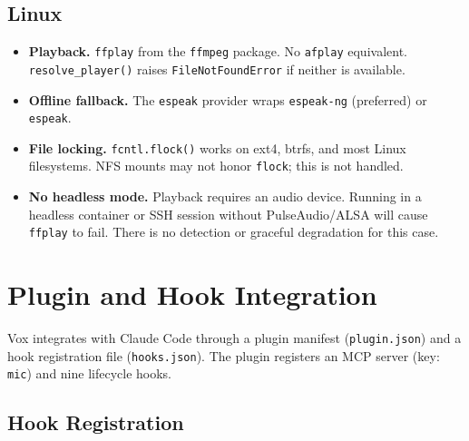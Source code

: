 \documentclass[a4paper,10pt]{article}
\begin{document}
\subsection{Linux}

\begin{itemize}
  \item \textbf{Playback.}  \texttt{ffplay} from the
    \texttt{ffmpeg} package.  No \texttt{afplay} equivalent.
    \texttt{resolve\_player()} raises \texttt{FileNotFoundError}
    if neither is available.
  \item \textbf{Offline fallback.}  The \texttt{espeak} provider
    wraps \texttt{espeak-ng} (preferred) or \texttt{espeak}.
  \item \textbf{File locking.}  \texttt{fcntl.flock()} works on
    ext4, btrfs, and most Linux filesystems.  NFS mounts may not
    honor \texttt{flock}; this is not handled.
  \item \textbf{No headless mode.}  Playback requires an audio
    device.  Running in a headless container or SSH session
    without PulseAudio/ALSA will cause \texttt{ffplay} to fail.
    There is no detection or graceful degradation for this case.
\end{itemize}


\section{Plugin and Hook Integration}

Vox integrates with Claude Code through a plugin manifest
(\texttt{plugin.json}) and a hook registration file
(\texttt{hooks.json}).  The plugin registers an MCP server
(key: \texttt{mic}) and nine lifecycle hooks.

\subsection{Hook Registration}
\end{document}
